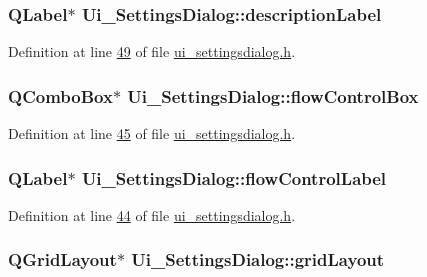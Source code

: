 \hypertarget{a00029_aaf2756662f744e79aa3443f1e035870d}{
\subsubsection[{description\+Label}]{\setlength{\rightskip}{0pt plus 5cm}Q\+Label$\ast$ Ui\+\_\+\+Settings\+Dialog\+::description\+Label}}\label{a00029_aaf2756662f744e79aa3443f1e035870d}


Definition at line \hyperlink{a00054_source_l00049}{49} of file \hyperlink{a00054_source}{ui\+\_\+settingsdialog.\+h}.

\hypertarget{a00029_a1ebdf5da704108eae1078cefc446fbef}{
\subsubsection[{flow\+Control\+Box}]{\setlength{\rightskip}{0pt plus 5cm}Q\+Combo\+Box$\ast$ Ui\+\_\+\+Settings\+Dialog\+::flow\+Control\+Box}}\label{a00029_a1ebdf5da704108eae1078cefc446fbef}


Definition at line \hyperlink{a00054_source_l00045}{45} of file \hyperlink{a00054_source}{ui\+\_\+settingsdialog.\+h}.

\hypertarget{a00029_a7876a6baf43bd21d3b816f6a5a24fffc}{
\subsubsection[{flow\+Control\+Label}]{\setlength{\rightskip}{0pt plus 5cm}Q\+Label$\ast$ Ui\+\_\+\+Settings\+Dialog\+::flow\+Control\+Label}}\label{a00029_a7876a6baf43bd21d3b816f6a5a24fffc}


Definition at line \hyperlink{a00054_source_l00044}{44} of file \hyperlink{a00054_source}{ui\+\_\+settingsdialog.\+h}.

\hypertarget{a00029_a07d152c7cc63e2cffdda613baea54c0f}{
\subsubsection[{grid\+Layout}]{\setlength{\rightskip}{0pt plus 5cm}Q\+Grid\+Layout$\ast$ Ui\+\_\+\+Settings\+Dialog\+::grid\+Layout}}\label{a00029_a07d152c7cc63e2cffdda613baea54c0f}


